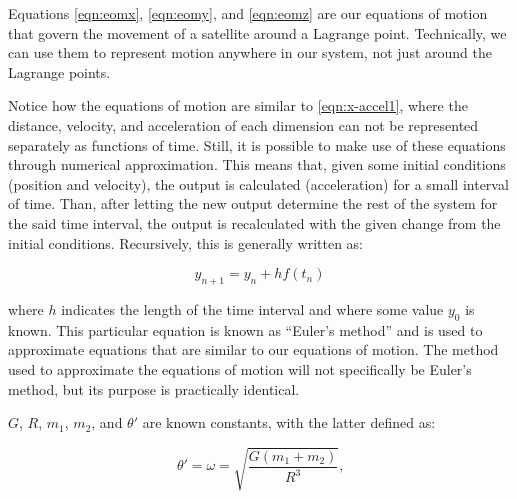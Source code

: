 Equations \eqref{eqn:eomx}, \eqref{eqn:eomy}, and \eqref{eqn:eomz} are our equations of motion that govern the movement of a satellite around a Lagrange point.
Technically, we can use them to represent motion anywhere in our system, not just around the Lagrange points.

Notice how the equations of motion are similar to \eqref{eqn:x-accel1}, where the distance, velocity, and acceleration of each dimension can not be represented separately as functions of time.
Still, it is possible to make use of these equations through numerical approximation.
This means that, given some initial conditions (position and velocity), the output is calculated (acceleration) for a small interval of time.
Than, after letting the new output determine the rest of the system for the said time interval, the output is recalculated with the given change from the initial conditions.
Recursively, this is generally written as:

\begin{equation*}
	y_{n+1} = y_n + hf(t_n)
\end{equation*}

where $h$ indicates the length of the time interval and where some value $y_0$ is known.
This particular equation is known as ``Euler's method''\autocite{BrilEulers} and is used to approximate equations that are similar to our equations of motion.
The method used to approximate the equations of motion will not specifically be Euler's method, but its purpose is practically identical.

$G$, $R$, $m_1$, $m_2$, and $\theta'$ are known constants, with the latter defined as:

\begin{equation*}
	\theta' = \omega = \sqrt{\frac{G(m_1 + m_2)}{R^3}} \text{,}
\end{equation*}

